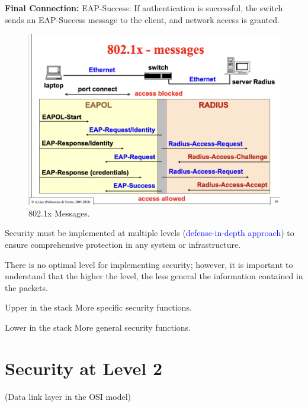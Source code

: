 \textbf{Final Connection:}
EAP-Success: If authentication is successful, the switch sends an EAP-Success message to the client, and network access is granted.
\begin{figure}[H]
    \includegraphics[width=\linewidth]{Images/NetSec/8021x_messages.png}
    \caption{802.1x Messages.}
    \label{fig:8021.x_messages}
\end{figure}

\hfill
\begin{center}
\end{center}

\begin{center}
    Security must be implemented at multiple levels (\textcolor{Blue}{defense-in-depth approach}) to ensure comprehensive protection in any system or infrastructure.
\end{center}
\hfill 

There is no optimal level for implementing security; however, it is important to understand that the higher the level, the less general the information contained in the packets.

\begin{tcolorbox}[colback=lightblue, colframe=blue!50!white]
    Upper in the stack \textrightarrow More specific security functions.
    
    Lower in the stack \textrightarrow More general security functions.
\end{tcolorbox}

\section{Security at Level 2}
(Data link layer in the OSI model)

